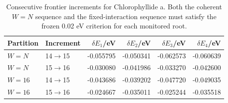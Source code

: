 \begin{table}[!htbp]\centering\small
\caption{Consecutive frontier increments for Chlorophyllide a. Both the coherent $W=N$ sequence and the fixed-interaction sequence must satisfy the frozen 0.02 eV criterion for each monitored root.}
\begin{tabular}{llrrrr}\toprule
Partition & Increment & $\delta E_1$/eV & $\delta E_2$/eV & $\delta E_3$/eV & $\delta E_4$/eV\\\midrule
$W=N$ & 14$\to$15 & -0.055795 & -0.050341 & -0.062573 & -0.060639\\
$W=N$ & 15$\to$16 & -0.030080 & -0.041986 & -0.033270 & -0.042600\\
$W=16$ & 14$\to$15 & -0.043686 & -0.039202 & -0.047720 & -0.049035\\
$W=16$ & 15$\to$16 & -0.024667 & -0.035011 & -0.025244 & -0.035518\\
\bottomrule\end{tabular}
\end{table}
